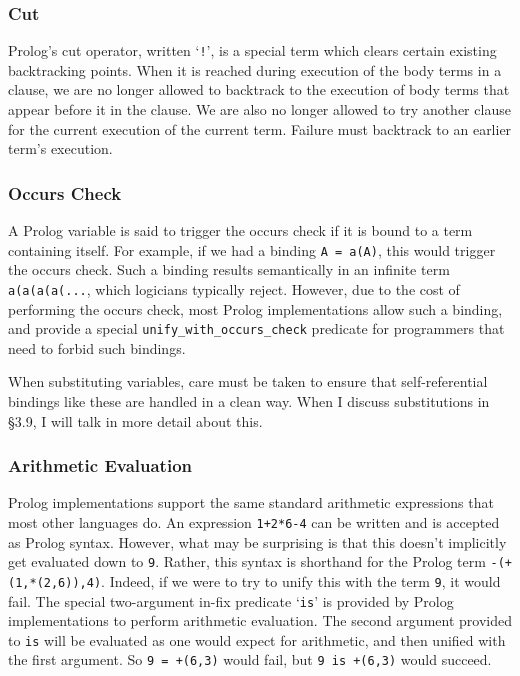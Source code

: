\documentclass[12pt]{article}
\begin{document}
\subsubsection{Cut}

Prolog's cut operator, written `\verb|!|', is a special term which clears certain existing backtracking points.
When it is reached during execution of the body terms in a clause, we are no longer allowed to backtrack to the execution of body terms that appear before it in the clause. 
We are also no longer allowed to try another clause for the current execution of the current term. 
Failure must backtrack to an earlier term's execution.

\subsubsection{Occurs Check}

A Prolog variable is said to trigger the occurs check if it is bound to a term containing itself.
For example, if we had a binding \verb|A = a(A)|, this would trigger the occurs check.
Such a binding results semantically in an infinite term \verb|a(a(a(a(...|, which logicians typically reject.
However, due to the cost of performing the occurs check, most Prolog implementations allow such a binding, and provide a special \verb|unify_with_occurs_check| predicate for programmers that need to forbid such bindings.

When substituting variables, care must be taken to ensure that self-referential bindings like these are handled in a clean way.
When I discuss substitutions in \S3.9, I will talk in more detail about this.

\subsubsection{Arithmetic Evaluation}

Prolog implementations support the same standard arithmetic expressions that most other languages do.
An expression \verb|1+2*6-4| can be written and is accepted as Prolog syntax.
However, what may be surprising is that this doesn't implicitly get evaluated down to \verb|9|. 
Rather, this syntax is shorthand for the Prolog term \verb|-(+(1,*(2,6)),4)|.
Indeed, if we were to try to unify this with the term \verb|9|, it would fail.
The special two-argument in-fix predicate `\verb|is|' is provided by Prolog implementations to perform arithmetic evaluation.
The second argument provided to \verb|is| will be evaluated as one would expect for arithmetic, and then unified with the first argument.
So \verb|9 = +(6,3)| would fail, but \verb|9 is +(6,3)| would succeed.
\end{document}
